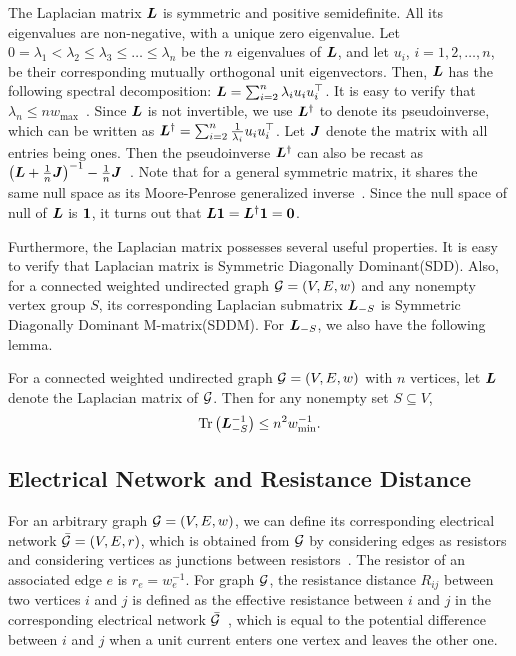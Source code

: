 \documentclass[journal]{IEEEtran}
\begin{document}
The Laplacian matrix \(\boldsymbol{L}\) is symmetric and positive semidefinite. All  its eigenvalues  are non-negative, with a unique zero eigenvalue. Let \(0=\lambda_1< \lambda_2 \leq \lambda_3\leq \dots\leq \lambda_{n}\) be the \(n\) eigenvalues of  \(\boldsymbol{L}\), and let \(u_i\), \( i={1,2,\dots,n}\), be their corresponding mutually orthogonal  unit eigenvectors. Then, \(\boldsymbol{L}\) has the following spectral decomposition:  \(\boldsymbol{L}=\sum_{i=2}^{n}\lambda_i u_iu_i^\top\).  It is easy to verify that \( \lambda_{n}\leq n w_{\max}\)~\cite{LiSc18}.
Since \(\boldsymbol{L}\) is not invertible, we use \(\boldsymbol{L}^{\dagger}\) to denote its pseudoinverse, which can be written as \(\boldsymbol{L}^{\dagger}=\sum_{i=2}^{n}\frac{1}{\lambda_i}u_iu_i^{\top}\). Let \(\boldsymbol{J}\) denote the matrix with all entries being ones. Then the pseudoinverse \(\boldsymbol{L}^{\dagger}\) can also be recast as \(\left( \boldsymbol{L} +\frac{1}{n}\boldsymbol{J} \right)^{-1} - \frac{1}{n}\boldsymbol{J}\)~\cite{GhBoSa08}. Note that for a general symmetric matrix, it shares the same null space as its Moore-Penrose generalized inverse~\cite{BeGrTh74}.
Since the  null space of  null of \({\boldsymbol{L}}\) is \( \boldsymbol{1}\),  it turns out that \({\boldsymbol{L}} \boldsymbol{1} ={\boldsymbol{L}}^{\dagger} \boldsymbol{1} =\mathbf{0}\).

Furthermore, the Laplacian matrix possesses several useful properties.
It is easy to verify that Laplacian matrix is Symmetric Diagonally Dominant(SDD).
Also, for a connected weighted undirected graph \(\mathcal{G}=(V,E,w)\) and any nonempty vertex group \(S\), its corresponding Laplacian submatrix \(\boldsymbol{L}_{-S}\) is Symmetric Diagonally Dominant M-matrix(SDDM).
For \(\boldsymbol{L}_{-S}\), we also have the following lemma.
\begin{lemma}\label{lem:trace-lap}
    For a connected weighted undirected graph \(\mathcal{G}=(V,E,w)\) with \(n\) vertices, let \(\boldsymbol{L}\) denote the Laplacian matrix of \(\mathcal{G}\).
    Then for any nonempty set \(S\subseteq V\),
    \begin{equation*}
        \mathrm{Tr}\left(\boldsymbol{L}_{-S}^{-1}\right)\le n^2w_{\min}^{-1}.
    \end{equation*}
\end{lemma}

\subsection{Electrical Network and Resistance Distance}

For an arbitrary graph \(\mathcal{G}=(V,E,w)\), we can define its corresponding electrical network \(\bar{\mathcal{G}}=(V,E,r)\), which is obtained from \(\mathcal{G}\)  by considering edges as resistors and considering vertices as junctions between resistors~\cite{DoSn84}. The resistor of an associated  edge \(e\) is \(r_e=w_e^{-1}\).  For graph  \(\mathcal{G}\), the resistance distance \(R_{ij}\) between two vertices \(i\) and \(j\)  is defined as the effective resistance between \(i\) and \(j\) in the corresponding  electrical network \(\bar{\mathcal{G}}\)~\cite{KlRa93}, which is equal to the potential difference between \(i\) and \(j\) when a unit current enters one vertex and leaves the other one.
\end{document}

